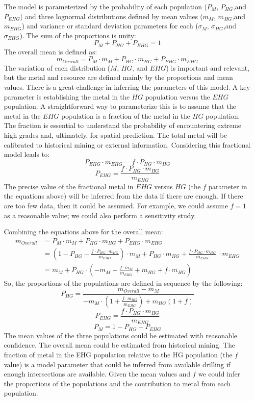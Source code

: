 The model is parameterized by the probability of each population ($P_{M}$, $P_{HG}$,and $P_{EHG}$) and three lognormal distributions defined by mean values ($m_{M}$, $m_{HG}$,and $m_{EHG}$) and variance or standard deviation parameters for each ($\sigma_{M}$, $\sigma_{HG}$,and $\sigma_{EHG}$).  The sum of the proportions is unity:
\[
    P_{M} + P_{HG} + P_{EHG}= 1
\]
The overall mean is defined as:
\[
    m_{Overall} = P_{M} \cdot m_{M}  + P_{HG} \cdot m_{HG} + P_{EHG} \cdot m_{EHG}
\]
The variation of each distribution ($M$, $HG$, and $EHG$) is important and relevant, but the metal and resource are defined mainly by the proportions and mean values. There is a great challenge in inferring the parameters of this model. A key parameter is establishing the metal in the $HG$ population versus the $EHG$ population. A straightforward way to parameterize this is to assume that the metal in the $EHG$ population is a fraction of the metal in the $HG$ population. The fraction is essential to understand the probability of encountering extreme high grades and, ultimately, for spatial prediction. The total metal will be calibrated to historical mining or external information. Considering this fractional model leads to:
\[
    P_{EHG} \cdot m_{EHG} = f \cdot P_{HG} \cdot m_{HG}
\]
\[
    P_{EHG} = \frac{f \cdot P_{HG} \cdot m_{HG}}{m_{EHG}}
\]
The precise value of the fractional metal in $EHG$ versus $HG$ (the $f$ parameter in the equations above) will be inferred from the data if there are enough. If there are too few data, then it could be assumed. For example, we could assume $f=1$ as a reasonable value; we could also perform a sensitivity study.

Combining the equations above for the overall mean:
\begin{align}
    m_{Overall} & = P_{M} \cdot m_{M}  + P_{HG} \cdot m_{HG} + P_{EHG} \cdot m_{EHG} \nonumber                                                                                                  \\
                & = \left(1-P_{HG}-\frac{f \cdot P_{HG} \cdot m_{HG}}{m_{EHG}}\right) \cdot m_{M} + P_{HG} \cdot m_{HG} + \frac{f \cdot P_{HG} \cdot m_{HG}}{m_{EHG}} \ \cdot m_{EHG} \nonumber \\
                & = m_{M} + P_{HG} \cdot \left( -m_{M}-\frac{f \cdot m_{M}}{m_{EHG}}  + m_{HG} + f \cdot m_{HG} \right) \nonumber
\end{align}
So, the proportions of the populations are defined in sequence by the following:
\[
    P_{HG} =
    \frac{m_{Overall} - m_M}
    {
        -m_M \cdot \left( 1+\frac{f \cdot m_{HG}}{m_{EHG}}\right) + m_{HG}(1+f)
    }
\]
\[
    P_{EHG} = \frac{f \cdot P_{HG} \cdot m_{HG}}{m_{EHG}}
\]
\[
    P_{M} = 1 - P_{HG} - P_{EHG}
\]
The mean values of the three populations could be estimated with reasonable confidence. The overall mean could be estimated from historical mining. The fraction of metal in the EHG population relative to the HG population (the $f$ value) is a model parameter that could be inferred from available drilling if enough intersections are available. Given the mean values and $f$ we could infer the proportions of the populations and the contribution to metal from each population.


